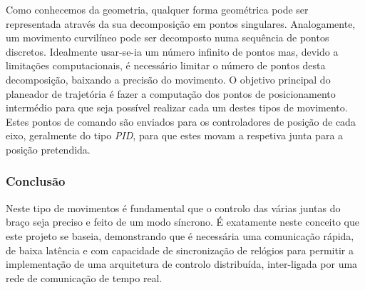 Como conhecemos da geometria, qualquer forma geométrica pode ser representada
através da sua decomposição em pontos singulares. Analogamente, um movimento
curvilíneo pode ser decomposto numa sequência de pontos discretos.
Idealmente usar-se-ia um número infinito de pontos mas, devido a limitações
computacionais, é necessário limitar o número de pontos desta decomposição,
baixando a precisão do movimento. O objetivo principal do planeador de
trajetória é fazer a computação dos pontos de posicionamento intermédio
para que seja possível realizar cada um destes tipos de movimento.
Estes pontos de comando são enviados para os controladores de posição de
cada eixo, geralmente do tipo \emph{PID}, para que estes movam a respetiva junta
para a posição pretendida.

\subsubsection{Conclusão}
Neste tipo de movimentos é fundamental que o controlo das várias juntas
do braço seja preciso e feito de um modo síncrono. É exatamente neste
conceito que este projeto se baseia, demonstrando que é necessária uma
comunicação rápida, de baixa latência e com capacidade de sincronização
de relógios para permitir a implementação de uma arquitetura de controlo
distribuída, inter-ligada por uma rede de comunicação de tempo real.
